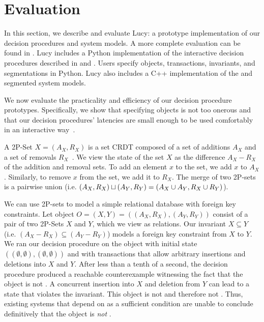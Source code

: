 \section{Evaluation}
In this section, we describe and evaluate Lucy: a prototype implementation of
our decision procedures and system models. A more complete evaluation can be
found in \cite{whittaker2018interactive}.
%
Lucy includes a Python implementation of the interactive decision procedures
described in  and
. Users
specify objects, transactions, invariants, and segmentations in Python.
%
Lucy also includes a C++ implementation of the \invariantconfluence{} and
segmented \invariantconfluence{} system models.

We now evaluate the practicality and efficiency of our decision procedure
prototypes. Specifically, we show that specifying objects is not too onerous
and that our decision procedures' latencies are small enough to be used
comfortably in an interactive way~\cite{liu2014effects}.

A 2P-Set $X = (A_X, R_X)$ is a set CRDT composed of a set of additions $A_X$
and a set of removals $R_X$~\cite{shapiro2011comprehensive}. We view the state
of the set $X$ as the difference $A_X - R_X$ of the addition and removal sets.
To add an element $x$ to the set, we add $x$ to $A_X$. Similarly, to remove $x$
from the set, we add it to $R_X$. The merge of two 2P-sets is a pairwise union
(i.e. $(A_X, R_X) \sqcup (A_Y, R_Y) = (A_X \cup A_Y, R_X \cup R_Y)$).

We can use 2P-sets to model a simple relational database with foreign key
constraints. Let object $O = (X, Y) = ((A_X, R_X), (A_Y, R_Y))$ consist of a
pair of two 2P-Sets $X$ and $Y$, which we view as relations. Our invariant $X
\subseteq Y$ (i.e. $(A_X - R_X) \subseteq (A_Y - R_Y)$) models a foreign key
constraint from $X$ to $Y$. We ran our decision procedure on the object with
initial state $((\emptyset, \emptyset), (\emptyset, \emptyset))$ and with
transactions that allow arbitrary insertions and deletions into $X$ and $Y$.
After less than a tenth of a second, the decision procedure produced a
reachable counterexample witnessing the fact that the object is not
\invariantconfluent{}. A concurrent insertion into $X$ and deletion from $Y$
can lead to a state that violates the invariant. This object is not
\invariantconfluent{} and therefore not \invariantclosed{}.
Thus, existing systems that depend on \invariantclosure{} as a sufficient
condition are unable to conclude definitively that the object is \emph{not}
\invariantconfluent{}.

